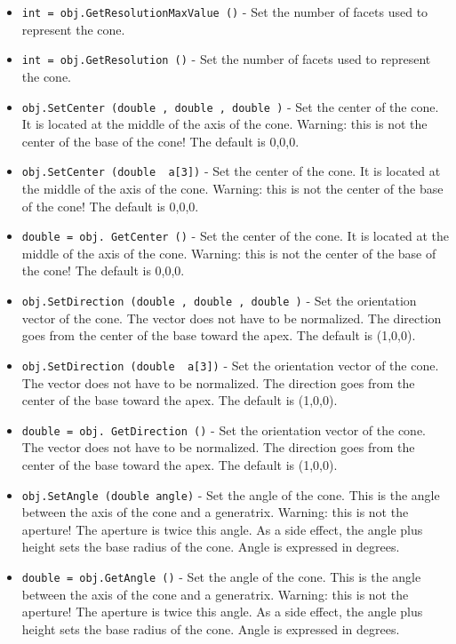 \begin{itemize}
\item  \verb|int = obj.GetResolutionMaxValue ()| -  Set the number of facets used to represent the cone.

\item  \verb|int = obj.GetResolution ()| -  Set the number of facets used to represent the cone.

\item  \verb|obj.SetCenter (double , double , double )| -  Set the center of the cone. It is located at the middle of the axis of
 the cone. Warning: this is not the center of the base of the cone!
 The default is 0,0,0.

\item  \verb|obj.SetCenter (double  a[3])| -  Set the center of the cone. It is located at the middle of the axis of
 the cone. Warning: this is not the center of the base of the cone!
 The default is 0,0,0.

\item  \verb|double = obj. GetCenter ()| -  Set the center of the cone. It is located at the middle of the axis of
 the cone. Warning: this is not the center of the base of the cone!
 The default is 0,0,0.

\item  \verb|obj.SetDirection (double , double , double )| -  Set the orientation vector of the cone. The vector does not have
 to be normalized. The direction goes from the center of the base toward
 the apex. The default is (1,0,0).

\item  \verb|obj.SetDirection (double  a[3])| -  Set the orientation vector of the cone. The vector does not have
 to be normalized. The direction goes from the center of the base toward
 the apex. The default is (1,0,0).

\item  \verb|double = obj. GetDirection ()| -  Set the orientation vector of the cone. The vector does not have
 to be normalized. The direction goes from the center of the base toward
 the apex. The default is (1,0,0).

\item  \verb|obj.SetAngle (double angle)| -  Set the angle of the cone. This is the angle between the axis of the cone
 and a generatrix. Warning: this is not the aperture! The aperture is
 twice this angle.
 As a side effect, the angle plus height sets the base radius of the cone.
 Angle is expressed in degrees.

\item  \verb|double = obj.GetAngle ()| -  Set the angle of the cone. This is the angle between the axis of the cone
 and a generatrix. Warning: this is not the aperture! The aperture is
 twice this angle.
 As a side effect, the angle plus height sets the base radius of the cone.
 Angle is expressed in degrees.


\end{itemize}
